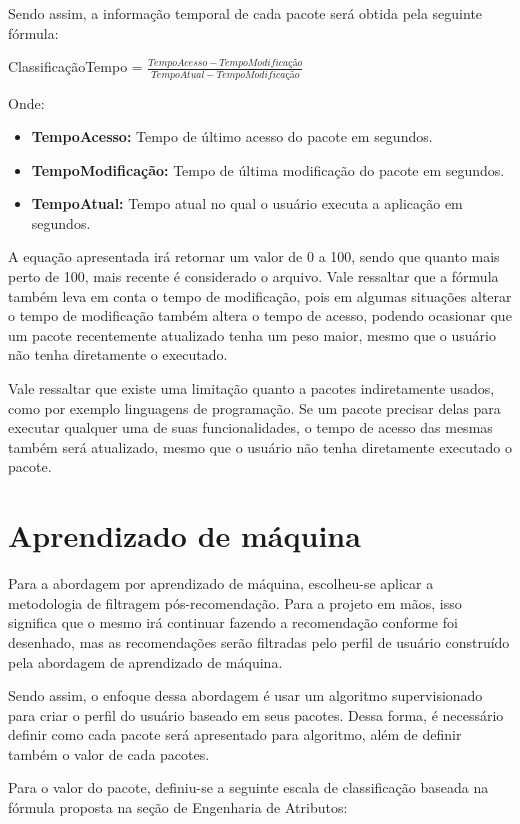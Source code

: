 Sendo assim, a informação temporal de cada pacote será obtida pela seguinte
fórmula:

ClassificaçãoTempo = $\frac{TempoAcesso - TempoModificação}{TempoAtual -
TempoModificação}$


Onde:

\begin{itemize}
    \item \textbf{TempoAcesso:} Tempo de último acesso do pacote em segundos.
    \item \textbf{TempoModificação:} Tempo de última modificação do pacote em
        segundos.
    \item \textbf{TempoAtual:} Tempo atual no qual o usuário executa a
        aplicação em segundos.
\end{itemize}


A equação apresentada irá retornar um valor de 0 a 100, sendo que quanto mais
perto de 100, mais recente é considerado o arquivo. Vale ressaltar que a fórmula
também leva em conta o tempo de modificação, pois em algumas situações alterar o
tempo de modificação também altera o tempo de acesso, podendo ocasionar que um
pacote recentemente atualizado tenha um peso maior, mesmo que o usuário não
tenha diretamente o executado.

Vale ressaltar que existe uma limitação quanto a pacotes indiretamente usados,
como por exemplo linguagens de programação. Se um pacote precisar delas para
executar qualquer uma de suas funcionalidades, o tempo de acesso das mesmas
também será atualizado, mesmo que o usuário não tenha diretamente executado o
pacote.

\section{Aprendizado de máquina}

Para a abordagem por aprendizado de máquina, escolheu-se aplicar a
metodologia de filtragem pós-recomendação. Para a projeto em mãos, isso
significa que o mesmo irá continuar fazendo a recomendação conforme foi
desenhado, mas as recomendações serão filtradas pelo perfil de usuário
construído pela abordagem de aprendizado de máquina.

Sendo assim, o enfoque dessa abordagem é usar um algoritmo supervisionado
para criar o perfil do usuário baseado em seus pacotes. Dessa forma, é
necessário definir como cada pacote será apresentado para algoritmo, além de
definir também o valor de cada pacotes.

Para o valor do pacote, definiu-se a seguinte escala de classificação baseada na
fórmula proposta na seção de Engenharia de Atributos:

